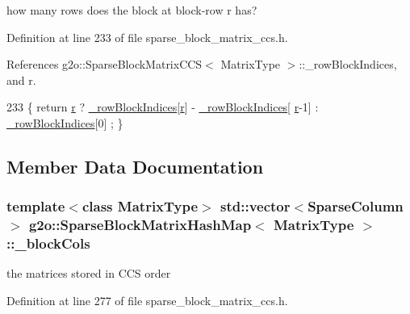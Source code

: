 how many rows does the block at block-\/row r has? 



Definition at line 233 of file sparse\+\_\+block\+\_\+matrix\+\_\+ccs.\+h.



References g2o\+::\+Sparse\+Block\+Matrix\+C\+C\+S$<$ Matrix\+Type $>$\+::\+\_\+row\+Block\+Indices, and r.


\begin{DoxyCode}
233 \{ \textcolor{keywordflow}{return} \hyperlink{sparse__block__matrix_8hpp_acab531abaa74a7e664e3986f2522b33a}{r} ? \hyperlink{classg2o_1_1SparseBlockMatrixHashMap_ab002c32872fbce7d3485a5032eaee0de}{\_rowBlockIndices}[\hyperlink{sparse__block__matrix_8hpp_acab531abaa74a7e664e3986f2522b33a}{r}] - \hyperlink{classg2o_1_1SparseBlockMatrixHashMap_ab002c32872fbce7d3485a5032eaee0de}{\_rowBlockIndices}[
      \hyperlink{sparse__block__matrix_8hpp_acab531abaa74a7e664e3986f2522b33a}{r}-1] : \hyperlink{classg2o_1_1SparseBlockMatrixHashMap_ab002c32872fbce7d3485a5032eaee0de}{\_rowBlockIndices}[0] ; \}
\end{DoxyCode}


\subsection{Member Data Documentation}
\subsubsection[{\texorpdfstring{\+\_\+block\+Cols}{_blockCols}}]{\setlength{\rightskip}{0pt plus 5cm}template$<$class Matrix\+Type$>$ std\+::vector$<${\bf Sparse\+Column}$>$ {\bf g2o\+::\+Sparse\+Block\+Matrix\+Hash\+Map}$<$ Matrix\+Type $>$\+::\+\_\+block\+Cols\hspace{0.3cm}{\ttfamily [protected]}}\hypertarget{classg2o_1_1SparseBlockMatrixHashMap_ae54514ce47f9cf1e54455d1f0adceb23}{}\label{classg2o_1_1SparseBlockMatrixHashMap_ae54514ce47f9cf1e54455d1f0adceb23}


the matrices stored in C\+CS order 



Definition at line 277 of file sparse\+\_\+block\+\_\+matrix\+\_\+ccs.\+h.

